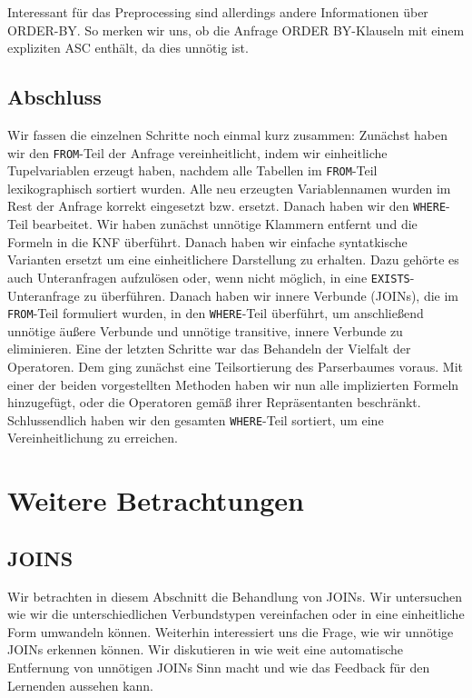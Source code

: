 Interessant für das Preprocessing sind allerdings andere Informationen über ORDER-BY. So merken wir uns, ob die Anfrage ORDER BY-Klauseln mit einem expliziten ASC enthält, da dies unnötig ist.

\subsection{Abschluss}

Wir fassen die einzelnen Schritte noch einmal kurz zusammen: Zunächst haben wir den \verb|FROM|-Teil der Anfrage vereinheitlicht, indem wir einheitliche Tupelvariablen erzeugt haben, nachdem alle Tabellen im \verb|FROM|-Teil lexikographisch sortiert wurden. Alle neu erzeugten Variablennamen wurden im Rest der Anfrage korrekt eingesetzt bzw. ersetzt. Danach haben wir den \verb|WHERE|-Teil bearbeitet. Wir haben zunächst unnötige Klammern entfernt und die Formeln in die KNF überführt. Danach haben wir einfache syntatkische Varianten ersetzt um eine einheitlichere Darstellung zu erhalten. Dazu gehörte es auch Unteranfragen aufzulösen oder, wenn nicht möglich, in eine \verb|EXISTS|-Unteranfrage zu überführen. Danach haben wir innere Verbunde (JOINs), die im \verb|FROM|-Teil formuliert wurden, in den \verb|WHERE|-Teil überführt, um anschließend unnötige äußere Verbunde und unnötige transitive, innere Verbunde  zu eliminieren. Eine der letzten Schritte war das Behandeln der Vielfalt der Operatoren. Dem ging zunächst eine Teilsortierung des Parserbaumes voraus. Mit einer der beiden vorgestellten Methoden haben wir nun alle implizierten Formeln hinzugefügt, oder die Operatoren gemäß ihrer Repräsentanten beschränkt. Schlussendlich haben wir den gesamten \verb|WHERE|-Teil sortiert, um eine Vereinheitlichung zu erreichen.


\section{Weitere Betrachtungen}

\subsection{JOINS}

Wir betrachten in diesem Abschnitt die Behandlung von JOINs. Wir untersuchen wie wir die unterschiedlichen Verbundstypen vereinfachen oder in eine einheitliche Form umwandeln können. Weiterhin interessiert uns die Frage, wie wir unnötige JOINs erkennen können. Wir diskutieren in wie weit eine automatische Entfernung von unnötigen JOINs Sinn macht und wie das Feedback für den Lernenden aussehen kann.

